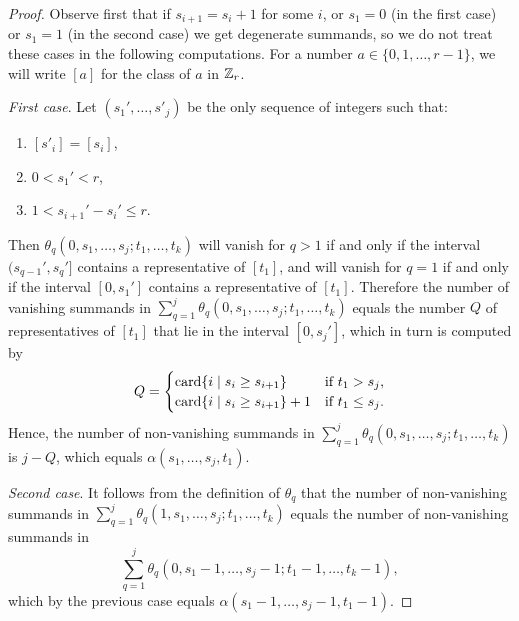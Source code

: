 \begin{proof}
	Observe first that if $s_{i+1} = s_i+1$ for some $i$, or $s_1 = 0$ (in the first case) or $s_1=1$ (in the second case) we get degenerate summands, so we do not treat these cases in the following computations.
	For a number $a\in \{0,1,\dots,r-1\}$, we will write $[a]$ for the class of $a$ in $\mathbb{Z}_{r}$.

	\vspace*{5pt}\noindent\textit{First case}.
	Let $(s_1',\dots,s'_j)$ be the only sequence of integers such that:
	\begin{enumerate}
		\item $[s'_i] = [s_i]$,
		\item $0< s_1'< r$,
		\item $1 < s_{i+1}' - s_i' \leq r$.
	\end{enumerate}
	Then $\theta_q(0,s_1,\dots,s_j;t_1,\dots,t_k)$ will vanish for $q>1$ if and only if the interval $(s_{q-1}',s_q']$ contains a representative of $[t_1]$, and will vanish for $q=1$ if and only if the interval $[0,s_1']$ contains a representative of $[t_1]$.
	Therefore the number of vanishing summands in $\sum_{q=1}^j\theta_q(0,s_1,\dots,s_j;t_1,\dots,t_k)$ equals the number $Q$ of representatives of $[t_1]$ that lie in the interval $[0,s_j']$, which in turn is computed by
	\[
	Q =
	\begin{cases}
		\operatorname{card}\{i \mid s_i \geq s_{i+1}\} & \text{if $t_1>s_j$}, \\
		\operatorname{card}\{i \mid s_i \geq s_{i+1}\} + 1 & \text{if $t_1\leq s_j$}.
	\end{cases}
	\]
	Hence, the number of non-vanishing summands in $\sum_{q=1}^j\theta_q(0,s_1,\dots,s_j;t_1,\dots,t_k)$ is $j-Q$, which equals $\alpha(s_1,\dots,s_j,t_1)$.

	\vspace*{5pt}\noindent\textit{Second case}.
	It follows from the definition of $\theta_q$ that the number of non-vanishing summands in $\sum_{q=1}^j \theta_q(1,s_1,\dots,s_j;t_1,\dots,t_k)$ equals the number of non-vanishing summands in
	\[
	\sum_{q=1}^j \theta_q(0,s_1-1,\dots,s_j-1;t_1-1,\dots,t_k-1),
	\]
	which by the previous case equals $\alpha(s_1-1,\dots,s_j-1,t_1-1)$.
\end{proof}

